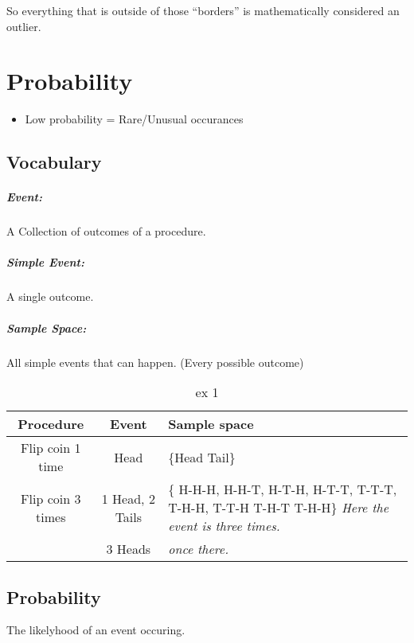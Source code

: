 \documentclass{book}
\begin{document}
So everything that is outside of those ``borders'' is mathematically considered an outlier.




\chapter{Probability}

\begin{itemize}
    \item Low probability = Rare/Unusual occurances
\end{itemize}

\section{Vocabulary}
\paragraph{Event:} A Collection of outcomes of a procedure.
\paragraph{Simple Event:} A single outcome.
\paragraph{Sample Space:} All simple events that can happen. (Every possible outcome)

\begin{table}[htbp]
    \centering
    \begin{tabular}{c|c|p{4cm}}
        \toprule
        Procedure & Event & Sample space \\ 
        \midrule
        Flip coin 1 time & Head & \{Head Tail\} \\
        \midrule
        Flip coin 3 times & 1 Head, 2 Tails & 
        \{ H-H-H, H-H-T, H-T-H, H-T-T, T-T-T, T-H-H, T-T-H T-H-T T-H-H\} \textit{Here the event is three times.} \\
                          & 3 Heads & \textit{once there.}\\
                          \bottomrule
    \end{tabular}
    \caption{ex 1}
\end{table}


\section{Probability}
The likelyhood of an event occuring.
\end{document}
